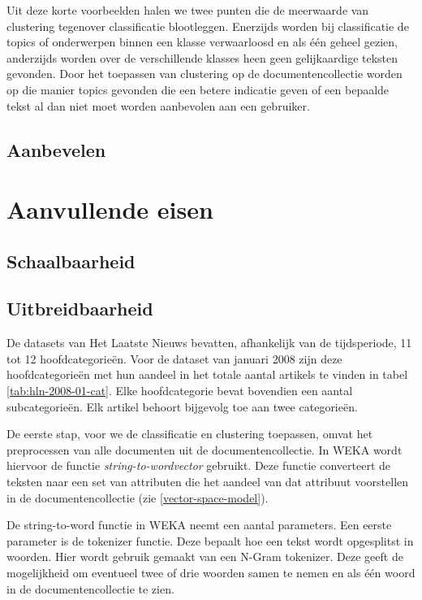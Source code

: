 Uit deze korte voorbeelden halen we twee punten die de meerwaarde van clustering tegenover classificatie blootleggen. Enerzijds worden bij classificatie de topics of onderwerpen binnen een klasse verwaarloosd en als \'e\'en geheel gezien, anderzijds worden over de verschillende klasses heen geen gelijkaardige teksten gevonden. Door het toepassen van clustering op de documentencollectie worden op die manier topics gevonden die een betere indicatie geven of een bepaalde tekst al dan niet moet worden aanbevolen aan een gebruiker. 

\subsection{Aanbevelen}


\section{Aanvullende eisen}
\subsection{Schaalbaarheid}
\subsection{Uitbreidbaarheid}








\iffalse
De datasets van Het Laatste Nieuws bevatten, afhankelijk van de tijdsperiode, 11 tot 12 hoofdcategorie\"en. Voor de dataset van januari 2008 zijn deze hoofdcategorie\"en met hun aandeel in het totale aantal artikels te vinden in tabel \ref{tab:hln-2008-01-cat}. Elke hoofdcategorie bevat bovendien een aantal subcategorie\"en. Elk artikel behoort bijgevolg toe aan twee categorie\"en. 

De eerste stap, voor we de classificatie en clustering toepassen, omvat het preprocessen van alle documenten uit de documentencollectie. In WEKA wordt hiervoor de functie \textit{string-to-wordvector} gebruikt. Deze functie converteert de teksten naar een set van attributen die het aandeel van dat attribuut voorstellen in de documentencollectie (zie \ref{vector-space-model}). 

De string-to-word functie in WEKA neemt een aantal parameters. Een eerste parameter is de tokenizer functie. Deze bepaalt hoe een tekst wordt opgesplitst in woorden. Hier wordt gebruik gemaakt van een N-Gram tokenizer. Deze geeft de mogelijkheid om eventueel twee of drie woorden samen te nemen en als \'e\'en woord in de documentencollectie te zien.

